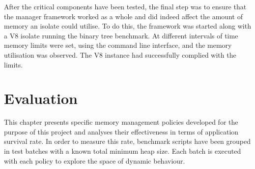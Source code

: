 \documentclass{l4proj}
\begin{document}
\hspace*{1em} After the critical components have been tested, the final step was to ensure that the manager framework worked as a whole and did indeed affect the amount of memory an isolate could utilise. To do this, the framework was started along with a V8 isolate running the binary tree benchmark. At different intervals of time memory limits were set, using the command line interface, and the memory utilisation was observed. The V8 instance had successfully complied with the limits.

\chapter{Evaluation}
\hspace*{1em} This chapter presents specific memory management policies developed for the purpose of this project and analyses their effectiveness in terms of application survival rate. In order to measure this rate, benchmark scripts have been grouped in test batches with a known total minimum heap size. Each batch is executed with each policy to explore the space of dynamic behaviour.
\end{document}
